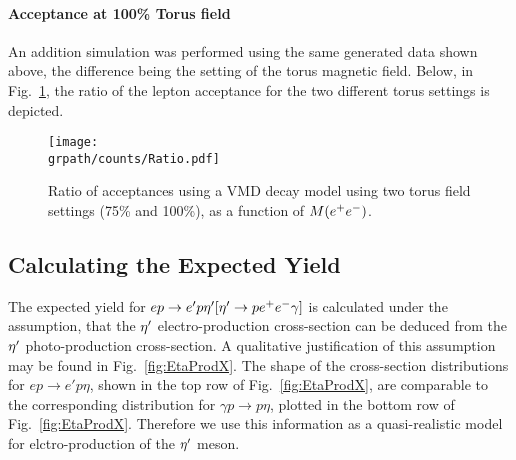 \paragraph{Acceptance at 100\% Torus field}
An addition simulation was performed using the same generated data shown above, the difference being the setting of the torus magnetic field. Below, in Fig.~\ref{fig:ratio}, the ratio of the lepton acceptance for the two different torus settings is depicted.
\begin{figure}[h!]\begin{center}
		\texttt{[image: \\grpath/counts/Ratio.pdf]}
		\caption[Acceptance, as a function of $M(\epem)$]{\label{fig:ratio}{Ratio of acceptances using a VMD decay model using two torus field settings (75\% and 100\%), as a function of $M(\epem)$. }}
	\end{center}\end{figure}
	\FloatBarrier
\subsection{Calculating the Expected Yield}\label{sec:yield}

The expected yield for $ep\to e'p \eta^{\prime} [\eta^{\prime}\rightarrow p e^+e^- \gamma ]$ is calculated under the assumption, that the $\eta^{\prime}$ electro-production cross-section can be deduced from the $\eta^{\prime}$ photo-production cross-section. A qualitative justification of this assumption may be found in Fig.~\ref{fig:EtaProdX}. The shape of the cross-section distributions for $ep\rightarrow e'p\eta$, shown in the top row of Fig.~\ref{fig:EtaProdX}, are comparable to the corresponding distribution for $\gamma p\rightarrow p\eta$, plotted in the bottom row of Fig.~\ref{fig:EtaProdX}. Therefore we use this information as a quasi-realistic model for elctro-production of the $\eta^{\prime}$ meson.

